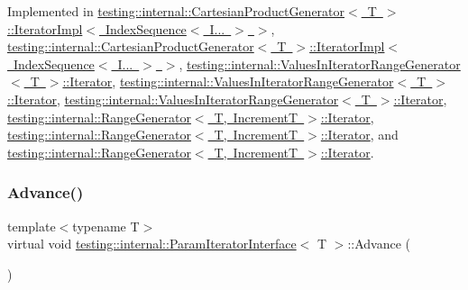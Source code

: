 Implemented in \mbox{\hyperlink{classtesting_1_1internal_1_1_cartesian_product_generator_1_1_iterator_impl_3_01_index_sequence_3_01_i_8_8_8_01_4_01_4_a167e8b38118c8635d5849daf924a517b}{testing\+::internal\+::\+Cartesian\+Product\+Generator$<$ T $>$\+::\+Iterator\+Impl$<$ Index\+Sequence$<$ I... $>$ $>$}}, \mbox{\hyperlink{classtesting_1_1internal_1_1_cartesian_product_generator_1_1_iterator_impl_3_01_index_sequence_3_01_i_8_8_8_01_4_01_4_a167e8b38118c8635d5849daf924a517b}{testing\+::internal\+::\+Cartesian\+Product\+Generator$<$ T $>$\+::\+Iterator\+Impl$<$ Index\+Sequence$<$ I... $>$ $>$}}, \mbox{\hyperlink{classtesting_1_1internal_1_1_values_in_iterator_range_generator_1_1_iterator_a5ff56489536cf5d90ed0ac07ffeb476b}{testing\+::internal\+::\+Values\+In\+Iterator\+Range\+Generator$<$ T $>$\+::\+Iterator}}, \mbox{\hyperlink{classtesting_1_1internal_1_1_values_in_iterator_range_generator_1_1_iterator_a5ff56489536cf5d90ed0ac07ffeb476b}{testing\+::internal\+::\+Values\+In\+Iterator\+Range\+Generator$<$ T $>$\+::\+Iterator}}, \mbox{\hyperlink{classtesting_1_1internal_1_1_values_in_iterator_range_generator_1_1_iterator_a49e0c9d26983eb8c76cc9c8ac4469dbf}{testing\+::internal\+::\+Values\+In\+Iterator\+Range\+Generator$<$ T $>$\+::\+Iterator}}, \mbox{\hyperlink{classtesting_1_1internal_1_1_range_generator_1_1_iterator_ad17bd99e352c43b8ab654a4ad479d06e}{testing\+::internal\+::\+Range\+Generator$<$ T, Increment\+T $>$\+::\+Iterator}}, \mbox{\hyperlink{classtesting_1_1internal_1_1_range_generator_1_1_iterator_ad17bd99e352c43b8ab654a4ad479d06e}{testing\+::internal\+::\+Range\+Generator$<$ T, Increment\+T $>$\+::\+Iterator}}, and \mbox{\hyperlink{classtesting_1_1internal_1_1_range_generator_1_1_iterator_a4a97adf3eafecc62a83dfb7cad1b27f0}{testing\+::internal\+::\+Range\+Generator$<$ T, Increment\+T $>$\+::\+Iterator}}.

\mbox{\label{classtesting_1_1internal_1_1_param_iterator_interface_a600dbd35fcb551463e379516a1abea48}} 
\subsubsection{\texorpdfstring{Advance()}{Advance()}\hspace{0.1cm}{\footnotesize\ttfamily [3/3]}}
{\footnotesize\ttfamily template$<$typename T$>$ \\
virtual void \mbox{\hyperlink{classtesting_1_1internal_1_1_param_iterator_interface}{testing\+::internal\+::\+Param\+Iterator\+Interface}}$<$ T $>$\+::Advance (\begin{DoxyParamCaption}{ }\end{DoxyParamCaption})\hspace{0.3cm}{\ttfamily [pure virtual]}}




